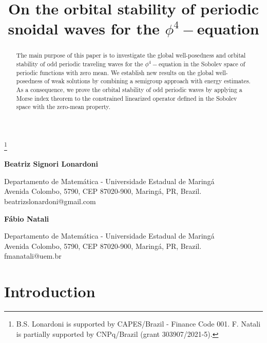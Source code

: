 \documentclass[12pt,reqno,a4paper]{amsart} %
\numberwithin{equation}{section}
\numberwithin{figure}{section}
\begin{document}
\vglue-1cm \hskip1cm
\title[Zero-mean periodic waves for the $\phi^4-$equation]{On the orbital stability of periodic snoidal waves for the $\phi^4-$equation}



\begin{center}

\thanks{B.S. Lonardoni is supported by CAPES/Brazil - Finance Code 001. F. Natali is partially supported by CNPq/Brazil (grant 303907/2021-5).}


\maketitle


{\bf Beatriz Signori Lonardoni}

{Departamento de Matem\'atica - Universidade Estadual de Maringá\\
	Avenida Colombo, 5790, CEP 87020-900, Maring\'a, PR, Brazil.}\\
{ beatrizslonardoni@gmail.com}



{\bf F\'abio Natali}

{Departamento de Matem\'atica - Universidade Estadual de Maring\'a\\
	Avenida Colombo, 5790, CEP 87020-900, Maring\'a, PR, Brazil.}\\
{ fmanatali@uem.br}

\vspace{3mm}

\end{center}

\begin{abstract}

The main purpose of this paper is to investigate the global well-posedness and orbital stability of odd periodic traveling waves for the $\phi^4-$equation in the Sobolev space of periodic functions with zero mean. We establish new results on the global well-posedness of weak solutions by combining a semigroup approach with energy estimates. As a consequence, we prove the orbital stability of odd periodic waves by applying a Morse index theorem to the constrained linearized operator defined in the Sobolev space with the zero-mean property.

\end{abstract}



\section{Introduction} 
\end{document}
